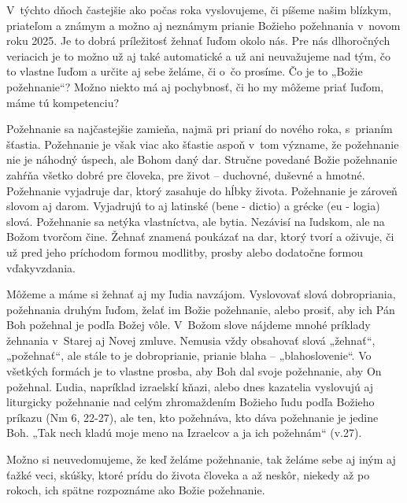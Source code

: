 \def\velkostpisma{9}
\def\velkostriadku{12}




V~týchto dňoch častejšie ako počas roka vyslovujeme, či píšeme našim blízkym, priateľom a známym a možno aj neznámym prianie Božieho požehnania v~novom roku 2025. Je to dobrá príležitosť žehnať ľuďom okolo nás. Pre nás dlhoročných veriacich je to možno už aj také automatické a už ani neuvažujeme nad tým, čo to vlastne ľuďom a určite aj sebe želáme, či o~čo prosíme. Čo je to „Božie požehnanie“? Možno niekto má aj pochybnosť, či ho my môžeme priať ľuďom, máme tú kompetenciu?

Požehnanie sa najčastejšie zamieňa, najmä pri prianí do nového roka, s~prianím šťastia. Požehnanie je však viac ako šťastie aspoň v~tom význame, že požehnanie nie je náhodný úspech, ale Bohom daný dar. Stručne povedané Božie požehnanie zahŕňa všetko dobré pre človeka, pre život -- duchovné, duševné a hmotné. Požehnanie vyjadruje dar, ktorý zasahuje do hĺbky života. Požehnanie je zároveň slovom aj darom. Vyjadrujú to aj latinské (bene - dictio) a grécke (eu - logia) slová. Požehnanie sa netýka vlastníctva, ale bytia. Nezávisí na ľudskom, ale na Božom tvorčom čine. Žehnať znamená poukázať na dar, ktorý tvorí a oživuje, či už pred jeho príchodom formou modlitby, prosby alebo dodatočne formou vďakyvzdania.

Môžeme a máme si žehnať aj my ľudia navzájom. Vyslovovať slová dobropriania, požehnania druhým ľuďom, želať im Božie požehnanie, alebo prosiť, aby ich Pán Boh požehnal je podľa Božej vôle. V~Božom slove nájdeme mnohé príklady žehnania v~Starej aj Novej zmluve. Nemusia vždy obsahovať slová „žehnať“, „požehnať“, ale stále to je dobroprianie, prianie blaha -- „blahoslovenie“. Vo všetkých formách je to vlastne prosba, aby Boh dal svoje požehnanie, aby On požehnal. Ľudia, napríklad izraelskí kňazi, alebo dnes kazatelia vyslovujú aj liturgicky požehnanie nad celým zhromaždením Božieho ľudu podľa Božieho príkazu (Nm 6, 22-27), ale ten, kto požehnáva, kto dáva požehnanie je jedine Boh. „Tak nech kladú moje meno na Izraelcov a ja ich požehnám“ (v.27).

Možno si neuvedomujeme, že keď želáme požehnanie, tak želáme sebe aj iným aj ťažké veci, skúšky, ktoré prídu do života človeka a až neskôr, niekedy až po rokoch, ich spätne rozpoznáme ako Božie požehnanie.

